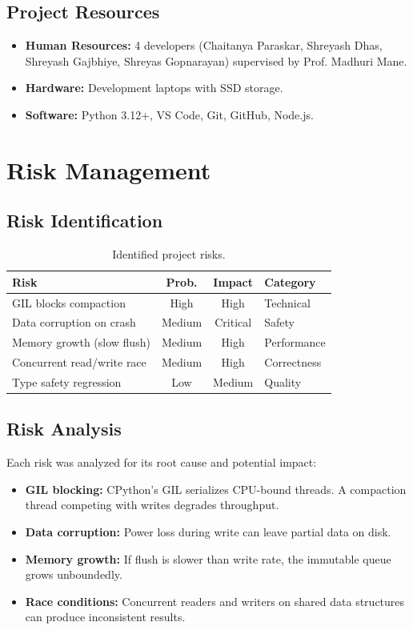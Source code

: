 \documentclass[oneside,a4paper,12pt]{book}
\begin{document}
\subsection{Project Resources}
\begin{itemize}[leftmargin=2em]
    \item \textbf{Human Resources:} 4 developers (Chaitanya Paraskar, Shreyash Dhas, Shreyash Gajbhiye, Shreyas Gopnarayan) supervised by Prof. Madhuri Mane.
    \item \textbf{Hardware:} Development laptops with SSD storage.
    \item \textbf{Software:} Python 3.12+, VS Code, Git, GitHub, Node.js.
\end{itemize}

\section{Risk Management}

\subsection{Risk Identification}

\begin{table}[!htbp]
\centering
\caption{Identified project risks.}
\renewcommand{\arraystretch}{1.3}
\begin{tabular}{|l|c|c|l|}
\hline
\textbf{Risk} & \textbf{Prob.} & \textbf{Impact} & \textbf{Category} \\
\hline
GIL blocks compaction & High & High & Technical \\
\hline
Data corruption on crash & Medium & Critical & Safety \\
\hline
Memory growth (slow flush) & Medium & High & Performance \\
\hline
Concurrent read/write race & Medium & High & Correctness \\
\hline
Type safety regression & Low & Medium & Quality \\
\hline
\end{tabular}
\end{table}

\subsection{Risk Analysis}

Each risk was analyzed for its root cause and potential impact:
\begin{itemize}[leftmargin=2em]
    \item \textbf{GIL blocking:} CPython's GIL serializes CPU-bound threads. A compaction thread competing with writes degrades throughput.
    \item \textbf{Data corruption:} Power loss during write can leave partial data on disk.
    \item \textbf{Memory growth:} If flush is slower than write rate, the immutable queue grows unboundedly.
    \item \textbf{Race conditions:} Concurrent readers and writers on shared data structures can produce inconsistent results.
\end{itemize}
\end{document}
